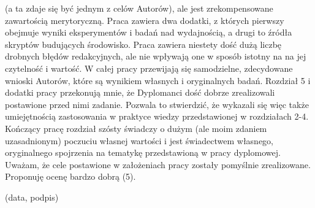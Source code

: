 (a ta zdaje się być jednym z celów Autorów), ale jest zrekompensowane zawartością
merytoryczną. Praca zawiera dwa dodatki, z których pierwszy obejmuje wyniki
eksperymentów i badań nad wydajnością, a drugi to źródła
skryptów budujących środowisko. Praca
zawiera niestety dość dużą liczbę drobnych błędów redakcyjnych, ale nie wpływają
one w sposób istotny na na jej czytelność i wartość. W całej pracy przewijają
się samodzielne, zdecydowane wnioski Autorów, które są wynikiem własnych i
oryginalnych badań.  Rozdział 5 i dodatki pracy przekonują mnie, że Dyplomanci dość
dobrze zrealizowali postawione przed nimi zadanie. Pozwala to stwierdzić, że
wykazali się więc także umiejętnością zastosowania w praktyce wiedzy
przedstawionej w rozdziałach 2-4. Kończący pracę rozdział szósty świadczy o
dużym (ale moim zdaniem uzasadnionym) poczuciu własnej wartości i jest
świadectwem własnego, oryginalnego spojrzenia na tematykę przedstawioną w pracy
dyplomowej. Uważam, że cele postawione w założeniach pracy zostały pomyślnie
zrealizowane. Proponuję ocenę bardzo dobrą (5).

\vskip 1cm
{
\raggedleft
(data, podpis)\kern1cm

}